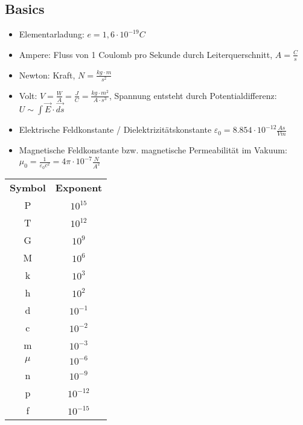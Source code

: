 \subsection*{Basics}
    \begin{itemize}
        \item Elementarladung: $e = 1,6 \cdot 10^{-19} C$
        \item Ampere: Fluss von 1 Coulomb pro Sekunde durch Leiterquerschnitt, $A = \frac{C}{s}$
        \item Newton: Kraft, $N = \frac{kg \cdot m}{s^2}$
        \item Volt: $V = \frac{W}{A} = \frac{J}{C} = \frac{kg \cdot m^2}{A \cdot s^3}$, Spannung entsteht durch Potentialdifferenz: $U \sim \int \overrightarrow{E} \cdot \overrightarrow{ds}$
        \item Elektrische Feldkonstante / Dielektrizitätskonstante $\varepsilon_0 = 8.854 \cdot 10^{-12} \frac{As}{Vm}$
        \item Magnetische Feldkonstante bzw. magnetische Permeabilität im Vakuum: $\mu_0 = \frac{1}{\varepsilon_0 c^2} = 4 \pi \cdot 10^{-7} \frac{N}{A^2}$
    \end{itemize}
    
    \begin{tabular}{c c}
        \textbf{Symbol} & \textbf{Exponent}\\
        P & $10^{15}$ \\
        T & $10^{12}$ \\
        G & $10^9$ \\
        M & $10^6$ \\
        k & $10^3$ \\
        h & $10^2$ \\
        d & $10^{-1}$ \\
        c & $10^{-2}$ \\
        m & $10^{-3}$ \\
        $\mu$ & $10^{-6}$ \\
        n & $10^{-9}$ \\
        p & $10^{-12}$ \\
        f & $10^{-15}$ \\
    \end{tabular}